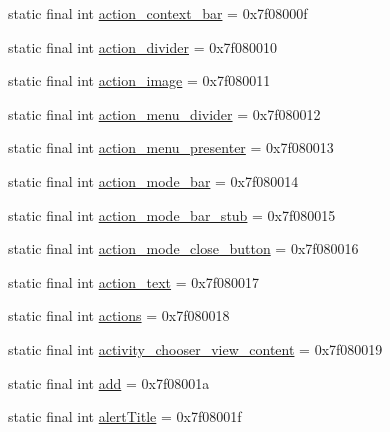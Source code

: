 \begin{DoxyCompactItemize}
\item 
static final int \mbox{\hyperlink{classandroid_1_1support_1_1v7_1_1appcompat_1_1R_1_1id_ad1965908d64ef4efb15b3160636a5ed8}{action\+\_\+context\+\_\+bar}} = 0x7f08000f
\item 
static final int \mbox{\hyperlink{classandroid_1_1support_1_1v7_1_1appcompat_1_1R_1_1id_a0a3104dca1878dbe491df3b2a159b926}{action\+\_\+divider}} = 0x7f080010
\item 
static final int \mbox{\hyperlink{classandroid_1_1support_1_1v7_1_1appcompat_1_1R_1_1id_a2ab76ad0e772dec4085ca071497c0d6d}{action\+\_\+image}} = 0x7f080011
\item 
static final int \mbox{\hyperlink{classandroid_1_1support_1_1v7_1_1appcompat_1_1R_1_1id_ac6f27784f564da74cdbfc67d6cd3137a}{action\+\_\+menu\+\_\+divider}} = 0x7f080012
\item 
static final int \mbox{\hyperlink{classandroid_1_1support_1_1v7_1_1appcompat_1_1R_1_1id_ab66934cd579e0cdffbb6fe852773d3ed}{action\+\_\+menu\+\_\+presenter}} = 0x7f080013
\item 
static final int \mbox{\hyperlink{classandroid_1_1support_1_1v7_1_1appcompat_1_1R_1_1id_a2f1bb6e3c76848980dee3e5b042a636e}{action\+\_\+mode\+\_\+bar}} = 0x7f080014
\item 
static final int \mbox{\hyperlink{classandroid_1_1support_1_1v7_1_1appcompat_1_1R_1_1id_a8f0e0b57baf177d6e5eeae0998ec7e80}{action\+\_\+mode\+\_\+bar\+\_\+stub}} = 0x7f080015
\item 
static final int \mbox{\hyperlink{classandroid_1_1support_1_1v7_1_1appcompat_1_1R_1_1id_ae146768e3a755580d17b7afbcd4def28}{action\+\_\+mode\+\_\+close\+\_\+button}} = 0x7f080016
\item 
static final int \mbox{\hyperlink{classandroid_1_1support_1_1v7_1_1appcompat_1_1R_1_1id_a454b7fa1539013f355561a71e79c3aae}{action\+\_\+text}} = 0x7f080017
\item 
static final int \mbox{\hyperlink{classandroid_1_1support_1_1v7_1_1appcompat_1_1R_1_1id_ae4e76339b70148af9a15dbee8b3b5dd1}{actions}} = 0x7f080018
\item 
static final int \mbox{\hyperlink{classandroid_1_1support_1_1v7_1_1appcompat_1_1R_1_1id_af98faa6b183536adf4a34e5131811132}{activity\+\_\+chooser\+\_\+view\+\_\+content}} = 0x7f080019
\item 
static final int \mbox{\hyperlink{classandroid_1_1support_1_1v7_1_1appcompat_1_1R_1_1id_a31ace3c8d2ebf57409a33a846539f196}{add}} = 0x7f08001a
\item 
static final int \mbox{\hyperlink{classandroid_1_1support_1_1v7_1_1appcompat_1_1R_1_1id_ad40c53e1bf9fa8b9f6f57d83f4b4d1a1}{alert\+Title}} = 0x7f08001f

\end{DoxyCompactItemize}
